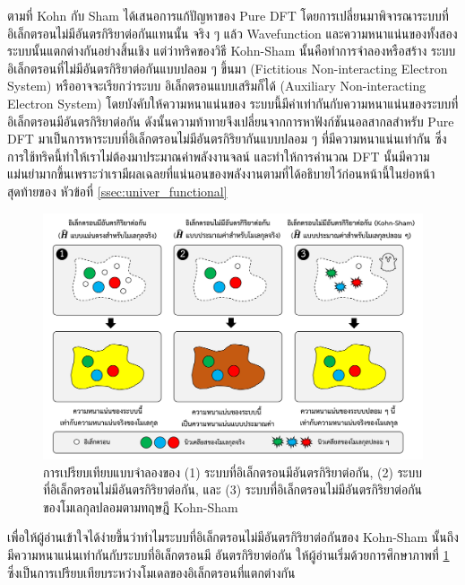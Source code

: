 ตามที่ Kohn กับ Sham ได้เสนอการแก้ปัญหาของ Pure DFT โดยการเปลี่ยนมาพิจารณาระบบที่อิเล็กตรอนไม่มีอันตรกิริยาต่อกันแทนนั้น จริง ๆ
แล้ว Wavefunction และความหนาแน่นของทั้งสองระบบนั้นแตกต่างกันอย่างสิ้นเชิง แต่ว่าทริคของวิธี Kohn-Sham นั้นคือทำการจำลองหรือสร้าง%
ระบบอิเล็กตรอนที่ไม่มีอันตรกิริยาต่อกันแบบปลอม ๆ ขึ้นมา (Fictitious Non-interacting Electron System) หรืออาจจะเรียกว่าระบบ%
อิเล็กตรอนแบบเสริมก็ได้ (Auxiliary Non-interacting Electron System)\autocite{martin2020} โดยบังคับให้ความหนาแน่นของ%
ระบบนี้มีค่าเท่ากันกับความหนาแน่นของระบบที่อิเล็กตรอนมีอันตรกิริยาต่อกัน ดังนั้นความท้าทายจึงเปลี่ยนจากการหาฟังก์ชันนอลสากลสำหรับ Pure DFT
มาเป็นการหาระบบที่อิเล็กตรอนไม่มีอันตรกิริยากันแบบปลอม ๆ ที่มีความหนาแน่นเท่ากัน ซึ่งการใช้ทริคนี้ทำให้เราไม่ต้องมาประมาณค่าพลังงานจลน์%
และทำให้การคำนวณ DFT นั้นมีความแม่นยำมากขึ้นเพราะว่าเรามีผลเฉลยที่แน่นอนของพลังงานตามที่ได้อธิบายไว้ก่อนหน้านี้ในย่อหน้าสุดท้ายของ%
หัวข้อที่ \ref{ssec:univer_functional}

\begin{figure}[htbp]
    \centering
    \includegraphics[width=\linewidth]{fig/electron_system.png}
    \caption{การเปรียบเทียบแบบจำลองของ (1) ระบบที่อิเล็กตรอนมีอันตรกิริยาต่อกัน, (2) ระบบที่อิเล็กตรอนไม่มีอันตรกิริยาต่อกัน, และ
        (3) ระบบที่อิเล็กตรอนไม่มีอันตรกิริยาต่อกันของโมเลกุลปลอมตามทฤษฎี Kohn-Sham}
    \label{fig:electron_system}
\end{figure}

เพื่อให้ผู้อ่านเข้าใจได้ง่ายขึ้นว่าทำไมระบบที่อิเล็กตรอนไม่มีอันตรกิริยาต่อกันของ Kohn-Sham นั้นถึงมีความหนาแน่นเท่ากันกับระบบที่อิเล็กตรอนมี%
อันตรกิริยาต่อกัน ให้ผู้อ่านเริ่มด้วยการศึกษาภาพที่ \ref{fig:electron_system} ซึ่งเป็นการเปรียบเทียบระหว่างโมเดลของอิเล็กตรอนที่แตกต่างกัน

